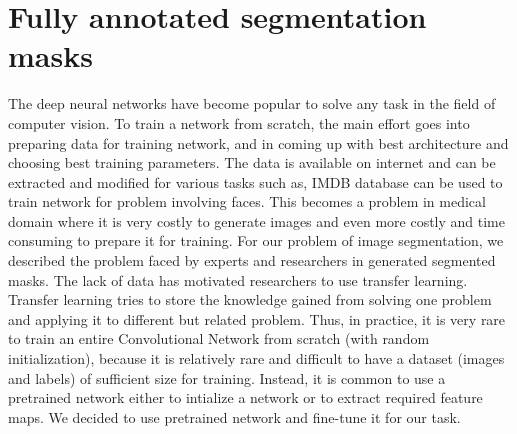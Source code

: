%
\newpage
\chapter{Fully annotated segmentation masks}
The deep neural networks have become popular to solve any task in the field of computer vision. To train a network from scratch, the main effort goes into preparing data for training network, and in coming up with best architecture and choosing best training parameters. The data is available on internet and can be extracted and modified for various tasks such as, IMDB database can be used to train network for problem involving faces. This becomes a problem in medical domain where it is very costly to generate images and even more costly and time consuming to prepare it for training. For our problem of image segmentation, we described the problem faced by experts and researchers in generated segmented masks. The lack of data has motivated researchers to use transfer learning. Transfer learning tries to store the knowledge gained from solving one problem and applying it to different but related problem. Thus, in practice, it is very rare to train an entire Convolutional Network from scratch (with random initialization), because it is relatively rare and difficult to have a dataset (images and labels) of sufficient size for training. Instead, it is common to use a pretrained network either to intialize a network or to extract required feature maps. We decided to use pretrained network and fine-tune it for our task.

